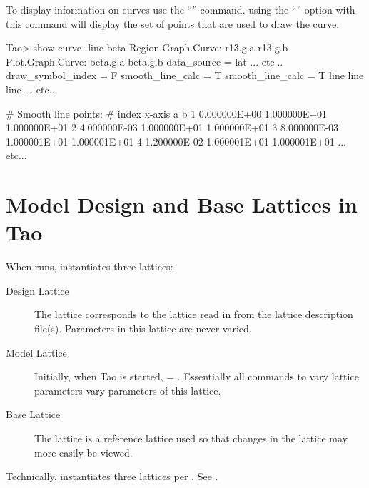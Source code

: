 \documentclass{hitec}
\newcommand{\Section}[1]{\section{#1}\vspace*{-1ex}}
\begin{document}
To display information on curves use the ``'' command. using the ``''
option with this command will display the set of points that are used to draw the curve:
\begin{code}
Tao> show curve -line beta
Region.Graph.Curve: r13.g.a
                    r13.g.b
Plot.Graph.Curve:   beta.g.a
                    beta.g.b
data_source          = lat
... etc...
draw_symbol_index    = F
smooth_line_calc     = T
smooth_line_calc     = T
line%
line%
line%
... etc...

# Smooth line points:
# index        x-axis             a             b
      1  0.000000E+00  1.000000E+01  1.000000E+01
      2  4.000000E-03  1.000000E+01  1.000000E+01
      3  8.000000E-03  1.000001E+01  1.000001E+01
      4  1.200000E-02  1.000001E+01  1.000001E+01
... etc...
\end{code}

\Section{Model Design and Base Lattices in Tao}

When \tao runs, \tao instantiates three lattices:
\begin{description}
\item[Design Lattice] \Newline
The  lattice corresponds to the lattice read in from the lattice
description file(s). Parameters in this lattice are never varied.
\item[Model Lattice] \Newline
Initially, when Tao is started,  = . Essentially all commands to vary lattice
parameters vary parameters of this lattice.
\item[Base Lattice] \Newline
The  lattice is a reference lattice used so that changes in the  
lattice may more easily be viewed.
\end{description}

Technically, \tao instantiates three lattices per . See .
\end{document}
